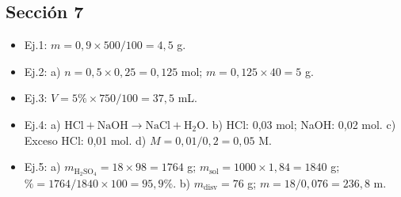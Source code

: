 \documentclass[11pt,a4paper]{article}
\begin{document}
\subsection*{Sección 7}
\begin{itemize}[nosep]
  \item Ej.1: $m = 0{,}9 \times 500/100 = 4{,}5$ g.
  \item Ej.2: a) $n = 0{,}5 \times 0{,}25 = 0{,}125$ mol; $m = 0{,}125 \times 40 = 5$ g.
  \item Ej.3: $V = 5\% \times 750/100 = 37{,}5$ mL.
  \item Ej.4: a) $\text{HCl} + \text{NaOH} \rightarrow \text{NaCl} + \text{H}_2\text{O}$. b) HCl: 0,03 mol; NaOH: 0,02 mol. c) Exceso HCl: 0,01 mol. d) $M = 0{,}01/0{,}2 = 0{,}05$ M.
  \item Ej.5: a) $m_{\text{H}_2\text{SO}_4} = 18 \times 98 = 1764$ g; $m_{\text{sol}} = 1000 \times 1{,}84 = 1840$ g; $\% = 1764/1840 \times 100 = 95{,}9\%$. b) $m_{\text{disv}} = 76$ g; $m = 18/0{,}076 = 236{,}8$ m.
\end{itemize}
\end{document}

